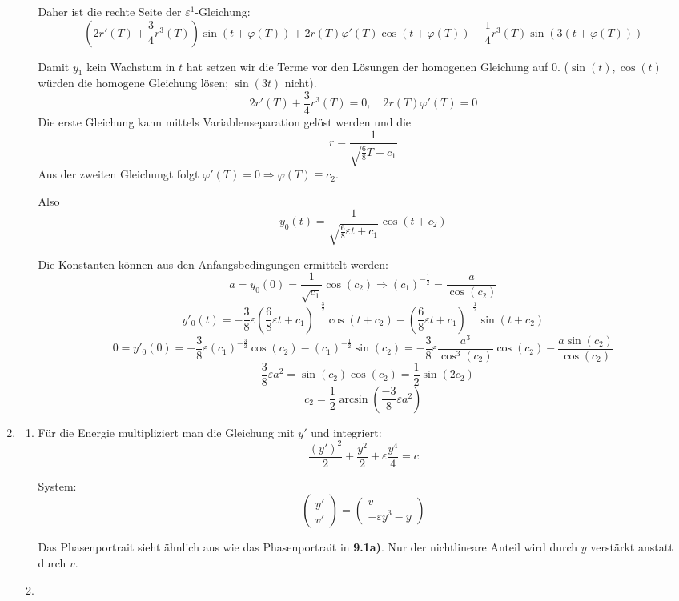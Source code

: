 \documentclass[a4paper,11pt]{scrartcl}
\newcommand*{\eps}{\varepsilon}
\begin{document}
\begin{enumerate}[label*=\textbf{9.\arabic*.}]
\begin{enumerate}
    Daher ist die rechte Seite der $\eps^1$-Gleichung:
    \[\left(2r'(T) + \frac{3}{4} r^3(T)\right) \sin(t + \varphi(T)) + 2 r(T) \varphi'(T) \cos(t
     + \varphi(T)) - \frac{1}{4} r^3(T) \sin(3(t + \varphi(T))) \]

   Damit $y_1$ kein Wachstum in $t$ hat setzen wir die Terme vor den Lösungen der
   homogenen Gleichung auf 0.
   ($\sin(t), \cos(t)$ würden die homogene Gleichung lösen; $\sin(3t)$ nicht).
   \[ 2r'(T) + \frac{3}{4}r^3(T) = 0, \quad 2r(T)\varphi'(T) = 0\]
   Die erste Gleichung kann mittels Variablenseparation gelöst werden und die
   \[ r = \frac{1}{\sqrt{\frac{6}{8}T + c_1}}\]
   Aus der zweiten Gleichungt folgt $\varphi'(T) = 0 \Rightarrow \varphi(T) \equiv c_2$.

   Also
   \[y_0(t) = \frac{1}{\sqrt{\frac{6}{8}\eps t + c_1}} \cos(t + c_2)\]

   Die Konstanten können aus den Anfangsbedingungen ermittelt werden:
   \[a = y_0(0) = \frac{1}{\sqrt{c_1}} \cos(c_2) \Rightarrow
     (c_1)^{-\frac{1}{2}} = \frac{a}{\cos(c_2)}\]
   \[y'_0(t) = -\frac{3}{8}\eps \left(\frac{6}{8}\eps t +
       c_1\right)^{-\frac{3}{2}} \cos(t+c_2)- \left(\frac{6}{8}\eps t +
       c_1\right)^{-\frac{1}{2}} \sin(t + c_2)\]
   \[0 = y'_0(0) = -\frac{3}{8}\eps \left(c_1\right)^{-\frac{3}{2}} \cos(c_2)
     - \left(c_1\right)^{-\frac{1}{2}} \sin(c_2)
   = -\frac{3}{8} \eps \frac{a^3}{\cos^3(c_2)} \cos(c_2) - \frac{a\sin(c_2)}{\cos(c_2)}\]
 \[-\frac{3}{8} \eps a^2 = \sin(c_2)\cos(c_2) = \frac{1}{2}\sin(2c_2)\]
 \[c_2 = \frac{1}{2}\arcsin\left(\frac{-3}{8}\eps a^2\right)\]

\end{enumerate}


\item \begin{enumerate}
  \item
    Für die Energie multipliziert man die Gleichung mit $y'$ und integriert:
    \[\frac{(y')^2}{2} + \frac{y^2}{2} + \eps \frac{y^4}{4} = c\]

    System:
    \[\begin{pmatrix}y'\\v'\end{pmatrix}=
      \begin{pmatrix}v\\-\eps y^3 - y\end{pmatrix}
    \]


    Das Phasenportrait sieht ähnlich aus wie das Phasenportrait in
    \textbf{9.1a)}. Nur der nichtlineare Anteil wird durch $y$ verstärkt anstatt
    durch $v$.
  \item
\end{enumerate}



\end{enumerate}
\end{document}

